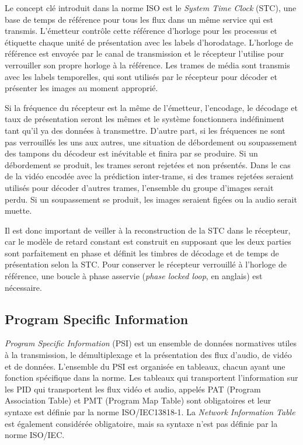 \documentclass[12pt,a4paper]{article}
\begin{document}
Le concept clé introduit dans la norme ISO est le \textit{System Time Clock} (STC), une base de temps de référence pour tous les flux dans un même service qui est transmis. L'émetteur contrôle cette référence d'horloge pour les processus et étiquette chaque unité de présentation avec les labels d'horodatage. L'horloge de référence est envoyée par le canal de transmission et le récepteur l'utilise pour verrouiller son propre horloge à la référence. Les trames de média sont transmis avec les labels temporelles, qui sont utilisés par le récepteur pour décoder et présenter les images au moment approprié. 

Si la fréquence du récepteur est la même de l'émetteur, l'encodage, le décodage et taux de présentation seront les mêmes et le système fonctionnera indéfiniment tant qu'il ya des données à transmettre. D'autre part, si les fréquences ne sont pas verrouillés les uns aux autres, une situation de débordement ou soupassement des tampons du décodeur est inévitable et finira par se produire. Si un débordement se produit, les trames seront rejetées et non présentés. Dans le cas de la vidéo encodée avec la prédiction inter-trame, si des trames rejetées seraient utilisés pour décoder d'autres trames, l'ensemble du groupe d'images serait perdu. Si un soupassement se produit, les images seraient figées ou la audio serait muette.

Il est donc important de veiller à la reconstruction de la STC dans le récepteur, car le modèle de retard constant est construit en supposant que les deux parties sont parfaitement en phase et définit les timbres de décodage et de temps de présentation selon la STC. Pour conserver le récepteur verrouillé à l'horloge de référence, une boucle à phase asservie (\textit{phase locked loop}, en anglais) est nécessaire.

\subsection{Program Specific Information}
\label{iso_psi}

\textit{Program Specific Information} (PSI) est un ensemble de données normatives utiles à la transmission, le démultiplexage et la présentation des flux d'audio, de vidéo et de données. L'ensemble du PSI est organisée en tableaux, chacun ayant une fonction spécifique dans la norme. Les tableaux qui transportent l'information sur les PID qui transportent les flux vidéo et audio, appelés PAT (Program Association Table) et PMT (Program Map Table) sont obligatoires et leur syntaxe est définie par la norme ISO/IEC13818-1. La \textit{Network Information Table} est également considérée obligatoire, mais sa syntaxe n'est pas définie par la norme ISO/IEC.
\end{document}
